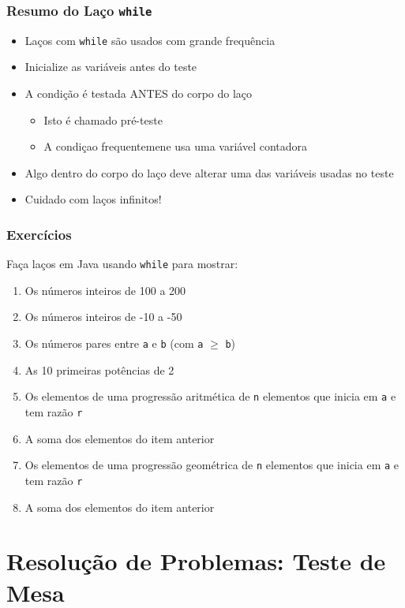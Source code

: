 \documentclass[xcolor={dvipsnames,table},aspectratio=169]{beamer}
\begin{document}
\begin{frame}\frametitle{Resumo do Laço \texttt{while}}
\begin{itemize}
	\item Laços com \texttt{while} são usados com grande frequência
	\item Inicialize as variáveis antes do teste
	\item A condição é testada ANTES do corpo do laço
	\begin{itemize}
		\item Isto é chamado pré-teste
		\item A condiçao frequentemene usa uma variável contadora
	\end{itemize}
	\item Algo dentro do corpo do laço deve alterar uma das variáveis usadas no teste
	\item Cuidado com laços infinitos!
\end{itemize}
\end{frame}

\begin{frame}\frametitle{Exercícios}
Faça laços em Java usando \texttt{while} para mostrar:
\begin{enumerate}
	\item Os números inteiros de 100 a 200
	\item Os números inteiros de -10 a -50
	\item Os números pares entre \texttt{a} e \texttt{b} (com \texttt{a} $\ge$ \texttt{b})
	\item As 10 primeiras potências de 2
	\item Os elementos de uma progressão aritmética de \texttt{n} elementos que inicia em \texttt{a} e tem razão \texttt{r}
	\item A soma dos elementos do item anterior
	\item Os elementos de uma progressão geométrica de \texttt{n} elementos que inicia em \texttt{a} e tem razão \texttt{r}
	\item A soma dos elementos do item anterior
\end{enumerate}
\end{frame}

\section{Resolução de Problemas: Teste de Mesa}
\end{document}
